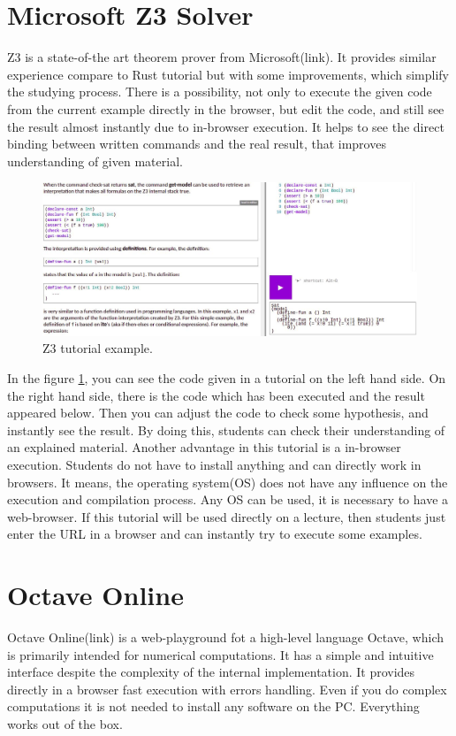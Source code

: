 \section{Microsoft Z3 Solver} \label{sec:z3}
Z3 is a state-of-the art theorem prover from Microsoft(link). It provides similar experience compare to Rust tutorial but with some improvements, which simplify the studying process. There is a possibility, not only to execute the given code from the current example directly in the browser, but edit the code, and still see the result almost instantly due to in-browser execution. It helps to see the direct binding between written commands and the real result, that improves understanding of given material.

\begin{figure}[h!]
    \centering
    \includegraphics[width=\linewidth]{src/pic/z3}
    \caption{Z3 tutorial example.}
    \label{fig:z3}
\end{figure}

In the figure \ref{fig:z3}, you can see the code given in a tutorial on the left hand side. On the right hand side, there is the code which has been executed and the result appeared below. Then you can adjust the code to check some hypothesis, and instantly see the result. By doing this, students can check their understanding of an explained material.
Another advantage in this tutorial is a in-browser execution. Students do not have to install anything and can directly work in browsers. It means, the operating system(OS) does not have any influence on the execution and compilation process. Any OS can be used, it is necessary to have a web-browser. If this tutorial will be used directly on a lecture, then students just enter the URL in a browser and can instantly try to execute some examples.

\section{Octave Online} \label{sec:octave}
Octave Online(link) is a web-playground fot a high-level language Octave, which is primarily intended for numerical computations. It has a simple and intuitive interface despite the complexity of the internal implementation. It provides directly in a browser fast execution with errors handling. Even if you do complex computations it is not needed to install any software on the PC. Everything works out of the box.

